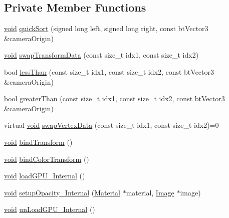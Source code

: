 \subsection*{Private Member Functions}
\begin{DoxyCompactItemize}
\item 
\mbox{\hyperlink{_thread_8h_af1e856da2e658414cb2456cb6f7ebc66}{void}} \mbox{\hyperlink{classnjli_1_1_geometry_af92dc57bfd9c3457085d2fdc4102cb22}{quick\+Sort}} (signed long left, signed long right, const bt\+Vector3 \&camera\+Origin)
\item 
\mbox{\hyperlink{_thread_8h_af1e856da2e658414cb2456cb6f7ebc66}{void}} \mbox{\hyperlink{classnjli_1_1_geometry_a67fcd3f18e15e7da88bc070eb7dca337}{swap\+Transform\+Data}} (const size\+\_\+t idx1, const size\+\_\+t idx2)
\item 
bool \mbox{\hyperlink{classnjli_1_1_geometry_a7bbffa4f383e7a89a52e9b426d58b285}{less\+Than}} (const size\+\_\+t idx1, const size\+\_\+t idx2, const bt\+Vector3 \&camera\+Origin)
\item 
bool \mbox{\hyperlink{classnjli_1_1_geometry_a5211fda676d03559ae8221b60b2738d2}{greater\+Than}} (const size\+\_\+t idx1, const size\+\_\+t idx2, const bt\+Vector3 \&camera\+Origin)
\item 
virtual \mbox{\hyperlink{_thread_8h_af1e856da2e658414cb2456cb6f7ebc66}{void}} \mbox{\hyperlink{classnjli_1_1_geometry_ac7ee1093062d2f342519f7914852a367}{swap\+Vertex\+Data}} (const size\+\_\+t idx1, const size\+\_\+t idx2)=0
\item 
\mbox{\hyperlink{_thread_8h_af1e856da2e658414cb2456cb6f7ebc66}{void}} \mbox{\hyperlink{classnjli_1_1_geometry_a450c71467016f8266e29c7dbcde2c4c6}{bind\+Transform}} ()
\item 
\mbox{\hyperlink{_thread_8h_af1e856da2e658414cb2456cb6f7ebc66}{void}} \mbox{\hyperlink{classnjli_1_1_geometry_ad8f86922c32926077dee808253fbc7df}{bind\+Color\+Transform}} ()
\item 
\mbox{\hyperlink{_thread_8h_af1e856da2e658414cb2456cb6f7ebc66}{void}} \mbox{\hyperlink{classnjli_1_1_geometry_a0c5aad85ac6ab14068c229abb87e2c17}{load\+G\+P\+U\+\_\+\+Internal}} ()
\item 
\mbox{\hyperlink{_thread_8h_af1e856da2e658414cb2456cb6f7ebc66}{void}} \mbox{\hyperlink{classnjli_1_1_geometry_aca4922f34c4daa4f3e6209c3ed5c2609}{setup\+Opacity\+\_\+\+Internal}} (\mbox{\hyperlink{classnjli_1_1_material}{Material}} $\ast$material, \mbox{\hyperlink{classnjli_1_1_image}{Image}} $\ast$image)
\item 
\mbox{\hyperlink{_thread_8h_af1e856da2e658414cb2456cb6f7ebc66}{void}} \mbox{\hyperlink{classnjli_1_1_geometry_ab4f7836b90acc74a61fce2d49d65a05f}{un\+Load\+G\+P\+U\+\_\+\+Internal}} ()
\end{DoxyCompactItemize}
